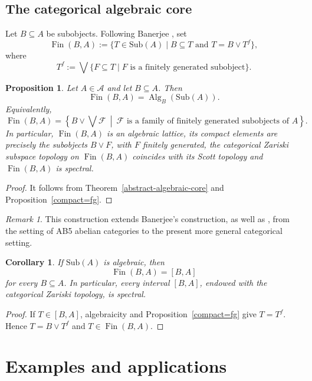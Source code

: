 \documentclass{amsproc}
\theoremstyle{definition}
\theoremstyle{plain}
\newtheorem{corollary}[theorem]{Corollary}
\newtheorem{Prop}[theorem]{Proposition}
\theoremstyle{remark}
\newtheorem{remark}[theorem]{Remark}
\numberwithin{equation}{section}
\newcommand{\Cal}[1]{{\mathcal #1}}
\newcommand{\sub}[1]{\mathrm{Sub} (#1)}
\newcommand{\Fin}{\operatorname{Fin}}
\newcommand{\Alg}{\operatorname{Alg}}
\begin{document}
\subsection{The categorical algebraic core}

Let $B\subseteq A$ be subobjects. Following Banerjee \cite{Banerjee}, set
$$
\Fin(B,A):=
\{T\in\sub A\mid B\subseteq T\text{ and }T=B\vee T^f\},
$$
where
$$
T^f:=\bigvee\{F\subseteq T\mid F\text{ is a finitely generated subobject}\}.
$$

\begin{Prop}\label{categorical-algebraic-core}
Let $A\in\mathscr A$ and let $B\subseteq A$. Then
$$
\Fin(B,A)=\Alg_B(\sub A).
$$
Equivalently,
$$
\Fin(B,A)
=
\left\{
B\vee\bigvee\Cal F
\ \middle|\ 
\Cal F\text{ is a family of finitely generated subobjects of }A
\right\}.
$$
In particular, $\Fin(B,A)$ is an algebraic lattice, its compact elements are precisely the subobjects $B\vee F$, with $F$ finitely generated, the categorical Zariski subspace topology on $\Fin(B,A)$ coincides with its Scott topology and $\Fin(B,A)$ is spectral.
\end{Prop}

\begin{proof}
It follows from Theorem~\ref{abstract-algebraic-core} and Proposition~\ref{compact=fg}.
\end{proof}

\begin{remark}
    This construction extends Banerjee's construction, as well as \cite[Proposition~2.1]{Banerjee}, from the setting of AB5 abelian categories to the present more general categorical setting.
\end{remark}

\begin{corollary}\label{interval-algebraic}
If $\sub A$ is algebraic, then
$$
\Fin(B,A)=[B,A]
$$
for every $B\subseteq A$. In particular, every interval $[B,A]$, endowed with the categorical Zariski topology, is spectral.
\end{corollary}

\begin{proof}
If $T\in[B,A]$, algebraicity and Proposition~\ref{compact=fg} give $T=T^f$. Hence $T=B\vee T^f$ and $T\in\Fin(B,A)$.
\end{proof}

\section{Examples and applications}
\end{document}
